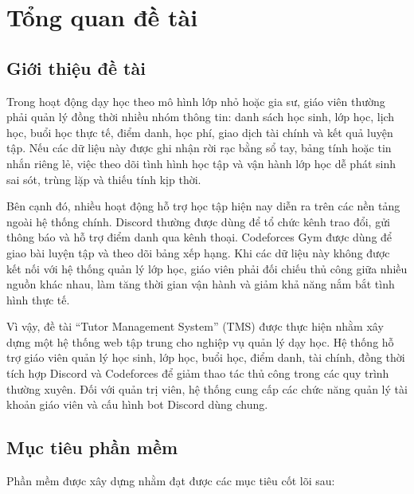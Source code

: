 \documentclass[12pt,a4paper]{article}
\begin{document}
\section{Tổng quan đề tài}

\subsection{Giới thiệu đề tài}

Trong hoạt động dạy học theo mô hình lớp nhỏ hoặc gia sư, giáo viên thường phải
quản lý đồng thời nhiều nhóm thông tin: danh sách học sinh, lớp học, lịch học,
buổi học thực tế, điểm danh, học phí, giao dịch tài chính và kết quả luyện tập.
Nếu các dữ liệu này được ghi nhận rời rạc bằng sổ tay, bảng tính hoặc tin nhắn
riêng lẻ, việc theo dõi tình hình học tập và vận hành lớp học dễ phát sinh sai
sót, trùng lặp và thiếu tính kịp thời.

Bên cạnh đó, nhiều hoạt động hỗ trợ học tập hiện nay diễn ra trên các nền tảng
ngoài hệ thống chính. Discord thường được dùng để tổ chức kênh trao đổi, gửi
thông báo và hỗ trợ điểm danh qua kênh thoại. Codeforces Gym được dùng để
giao bài luyện tập và theo dõi bảng xếp hạng. Khi các dữ liệu này không được
kết nối với hệ thống quản lý lớp học, giáo viên phải đối chiếu thủ công giữa
nhiều nguồn khác nhau, làm tăng thời gian vận hành và giảm khả năng nắm bắt
tình hình thực tế.

Vì vậy, đề tài ``Tutor Management System'' (TMS) được thực hiện nhằm xây dựng
một hệ thống web tập trung cho nghiệp vụ quản lý dạy học. Hệ thống hỗ trợ giáo
viên quản lý học sinh, lớp học, buổi học, điểm danh, tài chính, đồng thời tích
hợp Discord và Codeforces để giảm thao tác thủ công trong các quy trình thường
xuyên. Đối với quản trị viên, hệ thống cung cấp các chức năng quản lý tài khoản
giáo viên và cấu hình bot Discord dùng chung.

\subsection{Mục tiêu phần mềm}

Phần mềm được xây dựng nhằm đạt được các mục tiêu cốt lõi sau:
\end{document}
